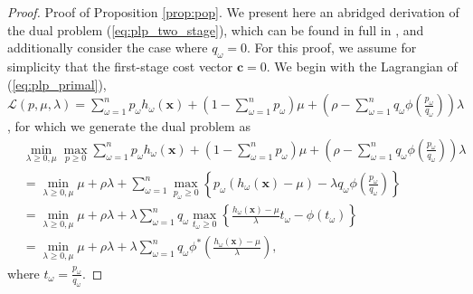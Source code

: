 \documentclass[ijoc,letterpaper]{informs3} %
\newcommand{\x}{\mathbf{x}}
\renewcommand{\c}{\mathbf{c}}
\begin{document}
\begin{proof}{\sc Proof of Proposition \ref{prop:pop}.}
	We present here an abridged derivation of the dual problem (\ref{eq:plp_two_stage}), which can be found in full in \cite{bental2011robust}, and additionally consider the case where $q_\omega = 0$.
	For this proof, we assume for simplicity that the first-stage cost vector $\c = 0$.	
	We begin with the Lagrangian of (\ref{eq:plp_primal}), $\mathcal{L}(p,\mu,\lambda) = \sum_{\omega=1}^n p_\omega h_\omega(\x) + \left( 1-\sum_{\omega=1}^n p_\omega \right)\mu + \left( \rho - \sum_{\omega=1}^n q_\omega \phi\left(\frac{p_\omega}{q_\omega}\right) \right)\lambda$, for which we generate the dual problem as
	\begin{align}
		 & \min_{\lambda \geq 0, \mu} \max_{p \geq 0} \sum_{\omega=1}^n p_\omega h_\omega(\x) + \left( 1-\sum_{\omega=1}^n p_\omega \right)\mu + \left( \rho - \sum_{\omega=1}^n q_\omega \phi\left(\frac{p_\omega}{q_\omega}\right) \right)\lambda \nonumber \\
		& = \min_{\lambda \geq 0, \mu} \mu + \rho\lambda + \sum_{\omega=1}^n \max_{p_\omega \geq 0} \left\{ p_\omega (h_\omega(\x) - \mu) - \lambda q_\omega \phi\left(\frac{p_\omega}{q_\omega}\right) \right\} \label{eq:pop_proof_detail_1} \\
		& =  \min_{\lambda \geq 0, \mu} \mu + \rho\lambda + \lambda \sum_{\omega=1}^n q_\omega \max_{t_\omega \geq 0} \left\{ \frac{h_\omega(\x) - \mu}{\lambda} t_\omega - \phi(t_\omega) \right\} \label{eq:pop_proof_detail_2} \\
		& = \min_{\lambda \geq 0, \mu} \mu + \rho\lambda + \lambda \sum_{\omega=1}^n q_\omega \phi^*\left(\frac{h_\omega(\x) - \mu}{\lambda}\right), \nonumber
	\end{align}
	where $t_\omega = \frac{p_\omega}{q_\omega}$.
	

\end{proof}
\end{document}
